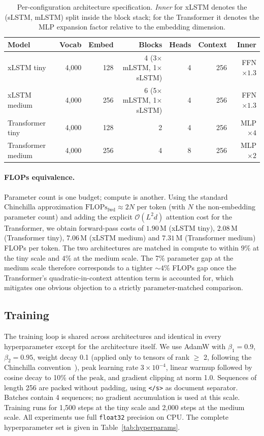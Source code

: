 \documentclass[11pt]{article}
\begin{document}
\begin{table}[h]
\centering
\caption{Per-configuration architecture specification. \emph{Inner} for
  xLSTM denotes the (sLSTM, mLSTM) split inside the block stack; for the
  Transformer it denotes the MLP expansion factor relative to the
  embedding dimension.}
\label{tab:archspec}
\small
\begin{tabular}{lrrrrrr}
\toprule
Model & Vocab & Embed & Blocks & Heads & Context & Inner \\
\midrule
xLSTM tiny         & 4{,}000 & 128 & 4 (3$\times$mLSTM, 1$\times$sLSTM) & 4 & 256 & FFN $\times 1.3$ \\
xLSTM medium       & 4{,}000 & 256 & 6 (5$\times$mLSTM, 1$\times$sLSTM) & 4 & 256 & FFN $\times 1.3$ \\
Transformer tiny   & 4{,}000 & 128 & 2 & 4 & 256 & MLP $\times 4$ \\
Transformer medium & 4{,}000 & 256 & 4 & 8 & 256 & MLP $\times 2$ \\
\bottomrule
\end{tabular}
\end{table}

\paragraph{FLOPs equivalence.}
Parameter count is one budget; compute is another. Using the standard
Chinchilla approximation $\text{FLOPs}_{\text{fwd}} \approx 2N$ per token
(with $N$ the non-embedding parameter count) and adding the explicit
$\mathcal{O}(L^2 d)$ attention cost for the Transformer, we obtain
forward-pass costs of $1.90$\,M (xLSTM tiny), $2.08$\,M (Transformer
tiny), $7.06$\,M (xLSTM medium) and $7.31$\,M (Transformer medium) FLOPs
per token. The two architectures are matched in compute to within $9\%$
at the tiny scale and $4\%$ at the medium scale. The 7\% parameter gap
at the medium scale therefore corresponds to a tighter $\sim 4\%$ FLOPs
gap once the Transformer's quadratic-in-context attention term is
accounted for, which mitigates one obvious objection to a strictly
parameter-matched comparison.

\subsection{Training}

The training loop is shared across architectures and identical in every
hyperparameter except for the architecture itself. We use AdamW with
\(\beta_1{=}0.9\), \(\beta_2{=}0.95\), weight decay 0.1 (applied only
to tensors of rank $\ge$ 2, following the Chinchilla
convention~\cite{hoffmann2022}), peak learning rate \(3 \times 10^{-4}\),
linear warmup followed by cosine decay to 10\% of the peak, and gradient
clipping at norm 1.0. Sequences of length 256 are packed without padding,
using \texttt{</s>} as document separator. Batches contain 4 sequences;
no gradient accumulation is used at this scale. Training runs for 1{,}500
steps at the tiny scale and 2{,}000 steps at the medium scale. All
experiments use full \texttt{float32} precision on CPU. The complete
hyperparameter set is given in Table~\ref{tab:hyperparams}.
\end{document}
